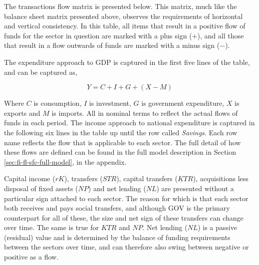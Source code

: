 \documentclass[
]{book}
\begin{document}
The transactions flow matrix is presented below. This matrix, much like the balance sheet matrix presented above, observes the requirements of horizontal and vertical consistency. In this table, all items that result in a positive flow of funds for the sector in question are marked with a plus sign (\(+\)), and all those that result in a flow outwards of funds are marked with a minus sign (\(-\)).

The expenditure approach to GDP is captured in the first five lines of the table, and can be captured as,

\begin{equation}
Y = C + I + G + (X - M)
\label{eq:gdp_intext}
\end{equation}

Where \(C\) is consumption, \(I\) is investment, \(G\) is government expenditure, \(X\) is exports and \(M\) is imports. All in nominal terms to reflect the actual flows of funds in each period. The income approach to national expenditure is captured in the following six lines in the table up until the row called \emph{Savings}. Each row name reflects the flow that is applicable to each sector. The full detail of how these flows are defined can be found in the full model description in Section \ref{sec:fi-fl-sfc-full-model}, in the appendix.

Capital income (\(rK\)), transfers (\(STR\)), capital transfers (\(KTR\)), acquisitions less disposal of fixed assets (\(NP\)) and net lending (\(NL\)) are presented without a particular sign attached to each sector. The reason for which is that each sector both receives and pays social transfers, and although GOV is the primary counterpart for all of these, the size and net sign of these transfers can change over time. The same is true for \(KTR\) and \(NP\). Net lending (\(NL\)) is a passive (residual) value and is determined by the balance of funding requirements between the sectors over time, and can therefore also swing between negative or positive as a flow.
\end{document}

